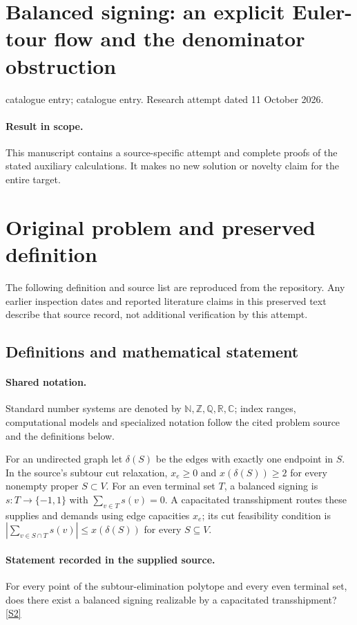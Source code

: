 \documentclass[11pt]{article}
\begin{document}
\section*{Balanced signing: an explicit Euler-tour flow and the denominator obstruction}
\noindent catalogue entry; catalogue entry. Research attempt dated 11 October 2026.
\paragraph{Result in scope.}This manuscript contains a source-specific attempt and complete proofs of the stated auxiliary calculations. It makes no new solution or novelty claim for the entire target.
\section{Original problem and preserved definition}
The following definition and source list are reproduced from the repository. Any earlier inspection dates and reported literature claims in this preserved text describe that source record, not additional verification by this attempt.
\subsection{Definitions and mathematical statement}

\paragraph{Shared notation.}Standard number systems are denoted by $\mathbb N,\mathbb Z,\mathbb Q,\mathbb R,\mathbb C$; index ranges, computational models and specialized notation follow the cited problem source and the definitions below.


For an undirected graph let $\delta(S)$ be the edges with exactly one endpoint in $S$. In the source's subtour cut relaxation, $x_e\geq0$ and $x(\delta(S))\geq2$ for every nonempty proper $S\subset V$. For an even terminal set $T$, a balanced signing is $s:T\to\{-1,1\}$ with $\sum_{v\in T}s(v)=0$. A capacitated transshipment routes these supplies and demands using edge capacities $x_e$; its cut feasibility condition is $|\sum_{v\in S\cap T}s(v)|\leq x(\delta(S))$ for every $S\subseteq V$.
\paragraph{Statement recorded in the supplied source.}
For every point of the subtour-elimination polytope and every even terminal set, does there exist a balanced signing realizable by a capacitated transshipment? \href{https://doi.org/10.4171/owr/2021/53}{[S2]}
\end{document}
